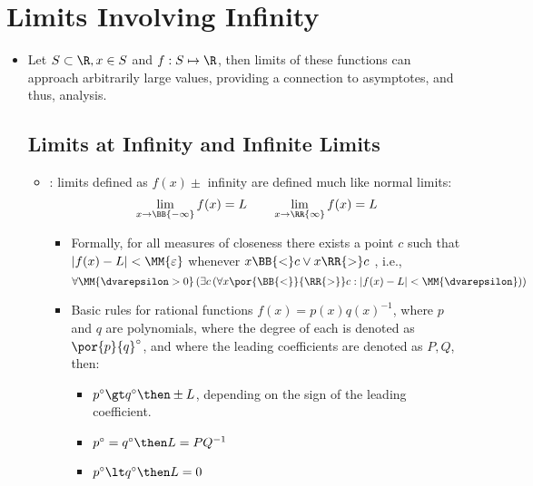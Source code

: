 \section{Limits Involving Infinity}
\begin{itemize}
  \item Let \( S \subset \R, x \in S \) and \( f : S \mapsto \R \), then limits
    of these functions can approach arbitrarily large \prn{\( \pm \)} values,
    providing a connection to asymptotes, and thus, analysis.

  \subsection{Limits at Infinity and Infinite Limits}
  \begin{itemize}
    \item {}: limits defined as \( f(x) \pm \) infinity
      are defined much like normal limits:
      \[
        \lim_{x \to \BB{-\infty}} f(x) = L \qquad \lim_{x \to \RR{\infty}} f(x) = L
      \]
      \begin{itemize}
        \item Formally, for all measures of closeness \MM{\(\varepsilon \)} there
          exists a point \( c \) such that \( |f(x) - L| < \MM{ \varepsilon} \)
          whenever \( x \BB{<} c \lor x \RR{>} c \) , i.e.,
          \[
            \forall \MM{\dvarepsilon > 0} \left(
              \exists c \left(
              \forall x \por{\BB{<}}{\RR{>}} c : | f(x) - L
                | < \MM{\dvarepsilon}
              \right)
            \right)
          \]
        \item Basic rules for rational functions \( f(x) = p(x)q(x)^{-1} \),
          where \( p \) and \( q \) are polynomials, where the degree of each
          is denoted as \( \por{p}{q}^\circ \), and where the leading coefficients
          are denoted as \( P, Q \), then:
          \begin{itemize}
            \item \( p ^\circ \gt q ^\circ \then \pm L \), depending on the sign
              of the leading coefficient.
            \item \( p ^\circ = q^\circ \then L = PQ^{-1} \)
            \item \( p^\circ \lt q^\circ \then L = 0 \)
          \end{itemize}


\end{itemize}
\end{itemize}
\end{itemize}
